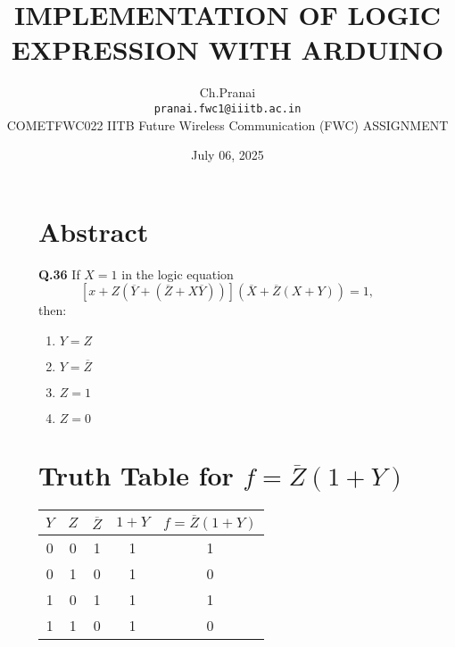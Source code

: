 \documentclass[12pt,a4paper]{article}
\title{\textbf{IMPLEMENTATION OF LOGIC EXPRESSION WITH ARDUINO}}
\author{Ch.Pranai \\ \texttt{pranai.fwc1@iiitb.ac.in} \\
 \hspace{-0.3cm}COMETFWC022\hspace{0.5cm} IITB Future Wireless Communication (FWC)\hspace{0.4cm} ASSIGNMENT}
\date{July 06, 2025}
\begin{document}
\maketitle


\begin{figure}[H]
  \centering
  \begin{minipage}[t]{0.48\textwidth}
    \section*{Abstract}
    \small
    \noindent\textbf{Q.36} \quad If $X = 1$ in the logic equation 
    \[
    \left[x + Z \left( \overline{Y} + (\overline{Z} + X\overline{Y}) \right) \right] 
    \left( \overline{X} + \overline{Z}(X + Y) \right) = 1,
    \]
    then:

    \begin{enumerate}[label=(\Alph*)]
        \item $Y = Z$
        \item $Y = \overline{Z}$
        \item $Z = 1$
        \item $Z = 0$
    \end{enumerate}

    \vspace{0.3cm}
    \section*{Truth Table for $f = \overline{Z}(1 + Y)$}
    \renewcommand{\arraystretch}{1.2}
    \begin{tabular}{|c|c|c|c|c|}
    \hline
    $Y$ & $Z$ & $\overline{Z}$ & $1 + Y$ & $f = \overline{Z}(1 + Y)$ \\
    \hline
    0 & 0 & 1 & 1 & 1 \\
    0 & 1 & 0 & 1 & 0 \\
    1 & 0 & 1 & 1 & 1 \\
    1 & 1 & 0 & 1 & 0 \\
    \hline
    \end{tabular}
  \end{minipage}\hfill
  \begin{minipage}[t]{0.48\textwidth}

\end{minipage}
\end{figure}
\end{document}
